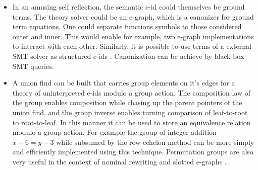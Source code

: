 \documentclass[sigconf]{acmart}
\begin{document}
\begin{itemize}
\item In an amusing self reflection, the semantic e-id could themselves be ground terms. The theory solver could be an e-graph, which is a canonizer for ground term equations. One could separate functions symbols to those considered outer and inner. This would enable for example, two e-graph implementations to interact with each other. Similarly, it is possible to use terms of a external SMT solver as structured e-ids \cite{extz3egraph}. Canonization can be achieve by black box SMT queries.

\item A union find can be built that carries group elements on it's edges \cite{Frühwirth_2009} \cite{lemerre2024labeled} \cite{groupoidunion} for a theory of uninterpreted e-ids modulo a group action.  The composition law of the group enables composition while chasing up the parent pointers of the union find, and the group inverse enables turning comparison of leaf-to-root to root-to-leaf. In this manner it can be used to store an equivalence relation modulo a group action. For example the group of integer addition $x + 6 = y - 3$ while subsumed by the row echelon method can be more simply and efficiently implemented using this technique. Permutation groups are also very useful in the context of nominal rewriting and slotted e-graphs \cite{slotted}.


\end{itemize}
\end{document}
